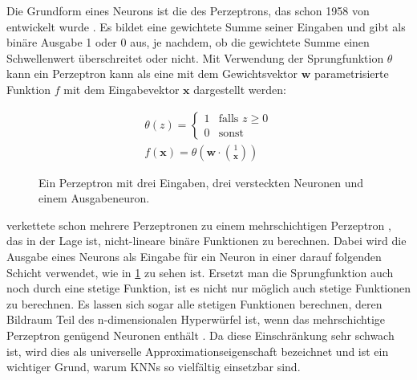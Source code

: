 Die Grundform eines Neurons ist die des Perzeptrons, das schon 1958 von  entwickelt wurde \cite{Rosenblatt1958}.
Es bildet eine gewichtete Summe seiner Eingaben und gibt als binäre Ausgabe 1 oder 0 aus, je nachdem, ob die gewichtete Summe einen Schwellenwert überschreitet oder nicht.
Mit Verwendung der Sprungfunktion $\theta$ kann ein Perzeptron kann als eine mit dem Gewichtsvektor $\mathbf{w}$ parametrisierte Funktion $f$ mit dem Eingabevektor $\mathbf{x}$ dargestellt werden:

$$
\begin{aligned}
    \theta (z) = \begin{cases} 1 & \text{falls } z \geq 0 \\ 0 & \text{sonst} \end{cases}
\\
f(\mathbf{x}) = \theta \left(\mathbf{w} \cdot \binom{1}{\mathbf{x}} \right)
\end{aligned}
$$

\begin{figure}
    \label{fig:perzeptron}
    \centering
    \caption{Ein Perzeptron mit drei Eingaben, drei versteckten Neuronen und einem Ausgabeneuron.}
\end{figure}

 verkettete schon mehrere Perzeptronen zu einem mehrschichtigen Perzeptron , das in der Lage ist, nicht-lineare binäre Funktionen zu berechnen.
Dabei wird die Ausgabe eines Neurons als Eingabe für ein Neuron in einer darauf folgenden Schicht verwendet, wie in \ref{fig:perzeptron} zu sehen ist.
Ersetzt man die Sprungfunktion auch noch durch eine stetige Funktion, ist es nicht nur möglich auch stetige Funktionen zu berechnen.
Es lassen sich sogar alle stetigen Funktionen berechnen, deren Bildraum Teil des n-dimensionalen Hyperwürfel ist, wenn das mehrschichtige Perzeptron genügend Neuronen enthält \cite{Amari1967, Cybenko1989}.
Da diese Einschränkung sehr schwach ist, wird dies als universelle Approximationseigenschaft bezeichnet und ist ein wichtiger Grund, warum KNNs so vielfältig einsetzbar sind.


